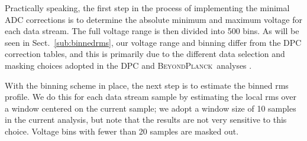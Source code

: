 \documentclass[twocolumn]{aa}
\newcommand{\BP}{\textsc{BeyondPlanck}}
\begin{document}
Practically speaking, the first step in the process of implementing the minimal ADC corrections is to determine the absolute minimum and maximum voltage for each data stream. The full voltage range is then divided into 500 bins. As will be seen in Sect.~\ref{sub:binnedrms}, our voltage range and binning differ from the DPC correction tables, and this is primarily due to the different data selection and masking choices adopted in the DPC and \BP\ analyses \citep{bp01,bp06,bp10}. 

With the binning scheme in place, the next step is to estimate the binned rms profile. We do this for each data stream sample by estimating the local rms over a window centered on the current sample; we adopt a window size of 10 samples in the current analysis, but note that the results are not very sensitive to this choice. Voltage bins with fewer than 20 samples are masked out.
\end{document}

